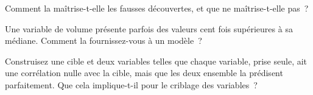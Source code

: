 \begin{interviewq}\label{iq:ml:feature-engineering-selection-and-importance:4}
Comment la  maîtrise-t-elle les fausses découvertes, et que ne maîtrise-t-elle pas~?
\end{interviewq}

\begin{interviewq}\label{iq:ml:feature-engineering-selection-and-importance:5}
Une variable de volume présente parfois des valeurs cent fois supérieures à sa médiane. Comment la fournissez-vous à un modèle~?
\end{interviewq}

\begin{interviewq}\label{iq:ml:feature-engineering-selection-and-importance:6}
Construisez une cible et deux variables telles que chaque variable, prise seule, ait une corrélation nulle avec la cible, mais
que les deux ensemble la prédisent parfaitement. Que cela implique-t-il pour le criblage des variables~?
\end{interviewq}
